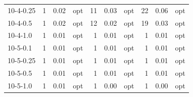 \documentclass[11pt]{article}
\begin{document}
\begin{table}[]
\begin{tabular}{lrrlrrlrrl}
10-4-0.25 & 1      & 0.02     & opt     & 11      & 0.03     & opt    & 22     & 0.06     & opt     \\
10-4-0.5  & 1      & 0.02     & opt     & 12      & 0.02     & opt    & 19     & 0.03     & opt     \\
10-4-1.0  & 1      & 0.01     & opt     & 1       & 0.01     & opt    & 1      & 0.01     & opt     \\
10-5-0.1  & 1      & 0.01     & opt     & 1       & 0.01     & opt    & 1      & 0.01     & opt     \\
10-5-0.25 & 1      & 0.01     & opt     & 1       & 0.01     & opt    & 1      & 0.01     & opt     \\
10-5-0.5  & 1      & 0.01     & opt     & 1       & 0.01     & opt    & 1      & 0.01     & opt     \\
10-5-1.0  & 1      & 0.01     & opt     & 1       & 0.00     & opt    & 1      & 0.00     & opt
\end{tabular}
\end{table}
\end{document}
